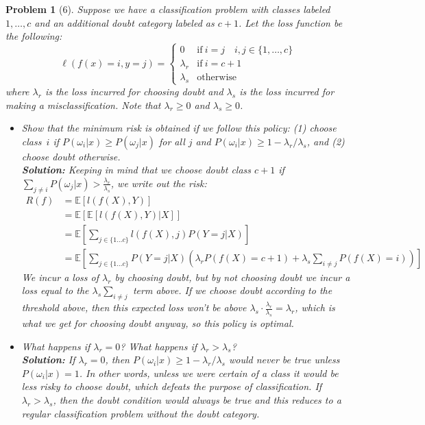 \documentclass[11pt]{article}
\theoremstyle{quest}
\newtheorem*{question}{Problem}
\newcommand{\E}{\mathbb{E}}
\begin{document}
\begin{question}[6]
Suppose we have a classification problem with classes labeled $1, \dotsc, c$ and an additional doubt category labeled as $c+1$.
Let the loss function be the following:\\
\[
\ell(f(x) = i, y = j) =
  \begin{cases}
   0 &  \mathrm{if}\ i=j \quad i,j\in\{1,\dotsc,c\} \\
   \lambda_r       & \mathrm{if}\ i=c+1 \\
   \lambda_s       & \text{otherwise}
  \end{cases}
\]
where $\lambda_r$ is the loss incurred for choosing doubt and $\lambda_s$ is the loss incurred for making a misclassification. Note that $\lambda_r \ge 0$ and $\lambda_s \ge 0$. 

\begin{itemize}
\item[(a)] Show that the minimum risk is obtained if we follow this policy: (1) choose class~$i$ if $P(\omega_i|x) \geq P(\omega_j|x)$ for all $j$ and $P(\omega_i|x) \geq 1-\lambda_r/\lambda_s$, and (2) choose doubt otherwise.\\
\textbf{Solution:}
Keeping in mind that we choose doubt class $c+1$ if $\sum_{j\neq i} P(\omega_j|x) > \frac{\lambda_r}{\lambda_s}$, we write out the risk: \begin{align*}
R(f) &= \E[l(f(X),Y)]\\
&= \E[\E[l(f(X),Y)|X]]\\
&= \E[\sum_{j\in \{1\ldots c\}} l(f(X),j)P(Y=j|X)]\\
&= \E[\sum_{j\in \{1\ldots c\}} P(Y=j|X)(\lambda_rP(f(X)=c+1)+\lambda_s\sum_{i\neq j} P(f(X)=i))]
\end{align*}
We incur a loss of $\lambda_r$ by choosing doubt, but by not choosing doubt we incur a loss equal to the $\lambda_s\sum_{i\neq j}$ term above. If we choose doubt according to the threshold above, then this expected loss won't be above $\lambda_s\cdot\frac{\lambda_r}{\lambda_s}=\lambda_r$, which is what we get for choosing doubt anyway, so this policy is optimal.
\vspace{0.5in}
\item[(b)] What happens if $\lambda_r=0$? What happens if $\lambda_r>\lambda_s$?\\
\textbf{Solution:}
If $\lambda_r=0$, then $P(\omega_i|x)\geq 1-\lambda_r/\lambda_s$ would never be true unless $P(\omega_i|x)=1$. In other words, unless we were certain of a class it would be less risky to choose doubt, which defeats the purpose of classification. If $\lambda_r>\lambda_s$, then the doubt condition would always be true and this reduces to a regular classification problem without the doubt category.
\end{itemize}
\end{question}
\vspace{25pt}
\end{document}
